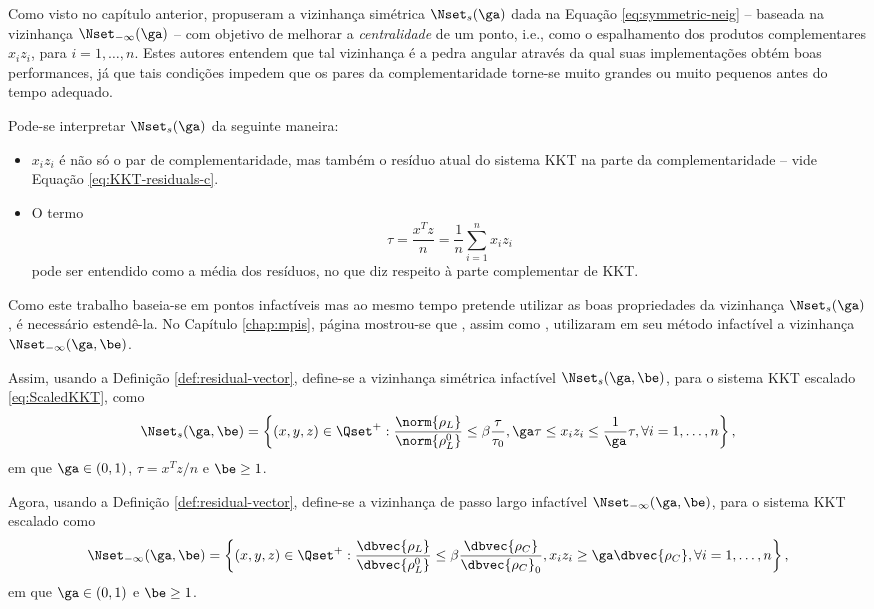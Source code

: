 Como visto no capítulo anterior, \citet{Colombo:2008ia}  propuseram  a
vizinhança simétrica $\Nset_s(\ga)$ dada na Equação \eqref{eq:symmetric-neig} --
baseada na vizinhança $\Nset_{-\infty}(\ga)$ --  com objetivo de melhorar a
\emph{centralidade} de um ponto, i.e., como o espalhamento dos produtos
complementares $x_iz_i$, para $i=1,\ldots,n$. Estes autores entendem que tal
vizinhança é a pedra angular através da qual suas implementações obtém boas
performances, já que tais condições impedem que os pares da complementaridade
torne-se muito grandes ou muito pequenos antes do tempo adequado.

Pode-se interpretar $\Nset_s(\ga)$ da seguinte maneira:
\begin{itemize}
  \item $x_iz_i$  é não só o par de complementaridade, mas também o resíduo
  atual do sistema KKT na parte da complementaridade -- vide  Equação
  \eqref{eq:KKT-residuals-c}.
  \item O termo  \[\tau = \frac{x^Tz}{n} = \frac{1}{n}\sum_{i=1}^nx_iz_i\]
  pode ser entendido como a média dos resíduos, no que diz respeito à parte
  complementar de KKT.
\end{itemize}

Como este trabalho  baseia-se em pontos infactíveis mas ao mesmo tempo
pretende utilizar as boas propriedades da vizinhança  $\Nset_s(\ga)$,
é necessário estendê-la. No Capítulo \ref{chap:mpis}, página \pageref{eq:infeasible-infty-neig}
mostrou-se que \citet{Kojima:1993fe}, assim como 
\citet[pg.~110]{Wright:Primal-dual-interior-point:1997h}, utilizaram em seu
método infactível a vizinhança $\Nset_{-\infty}(\ga,\be)$.


Assim, usando a Definição \ref{def:residual-vector}, define-se  a vizinhança
simétrica infactível $\Nset_s(\ga,\be)$, para o sistema KKT escalado
\eqref{eq:ScaledKKT}, como 
\begin{equation}
\label{eq:infeasible-symmetric-neig}
 \Nset_{s}(\ga,\be) =
 \left\{(x,y,z) \in \Qset^+:\frac{\norm{\rho_L}}{\norm{\rho^0_L}} \leq
\beta\frac{\tau}{\tau_0}, \ga\tau\leq x_iz_i \leq
\frac{1}{\ga}\tau,\forall i =1,\ldots,n  \right\},
\end{equation}
em que $\ga\in(0,1)$, $\tau=x^Tz/n$ e $\be\geq1$.

Agora, usando a Definição \ref{def:residual-vector}, define-se  a vizinhança
de passo largo infactível $\Nset_{-\infty}(\ga,\be)$, para o sistema KKT escalado
como
\begin{equation}
\Nset_{-\infty}(\ga,\be) =
 \left\{(x,y,z) \in \Qset^+:\frac{\dbvec{\rho_L}}{\dbvec{\rho^0_L}} \leq
\beta\frac{\dbvec{\rho_C}}{\dbvec{\rho_C}_0}, x_iz_i \geq
{\ga}\dbvec{\rho_C},\forall i =1,\ldots,n  \right\},
\end{equation}
em que $\ga\in(0,1)$ e $\be\geq1$. 




